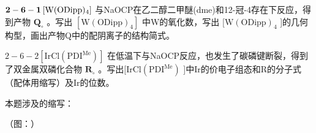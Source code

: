 ${ \bf 2 - 6 - 1 } \left[ \mathrm { W ( O D i p p ) _ { 4 } } \right]$ 与NaOCP在⼄⼆醇⼆甲醚(dme)和12-冠-4存在下反应，得到产物 $\mathbf { Q } _ { \circ }$ 。写出 $[ \mathrm { W ( O D i p p ) _ { 4 } } ]$ 中W的氧化数，写出 $\mathrm { [ W ( O D i p p ) _ { 4 } }$ ]的⼏何构型，画出产物Q中的配阴离⼦的结构简式。

$2 { - } 6 { - } 2 \left[ \mathrm { I r C l ( P D I ^ { M e } ) } \right]$ 在低温下与NaOCP反应，也发⽣了碳磷键断裂，得到了双⾦属双磷化合物 $\mathbf { R } _ { \circ }$ 。写出$\mathrm { [ I r C l ( P D I ^ { M e } ) }$ ]中Ir的价电⼦组态和R的分⼦式（配体⽤缩写）及Ir的位数。

本题涉及的缩写：

（图：）
